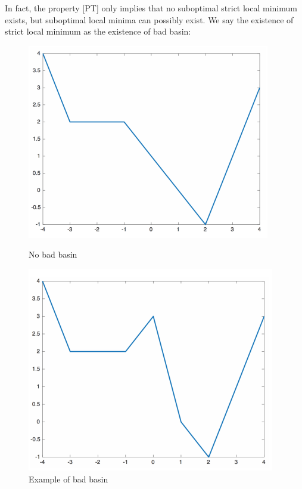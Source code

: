 In fact, the property [PT] only implies that 
no suboptimal strict local minimum exists, but suboptimal local minima can possibly exist.
We say the existence of strict local minimum as the existence of bad basin:
\begin{figure}[H]
\centering
\begin{minipage}[t]{0.48\textwidth}
\centering
\includegraphics[width=\textwidth]{Sixth_lecture/f_5.png}
\caption{No bad basin}
\label{fig:6:2}
\end{minipage}
\begin{minipage}[t]{0.48\textwidth}
\centering
\includegraphics[width=\textwidth]{Sixth_lecture/f_6.png}
\caption{Example of bad basin}
\label{fig:6:3}
\end{minipage}
\end{figure}

